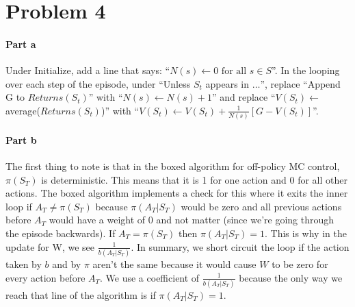 \documentclass[12pt]{article}
\begin{document}
\section{Problem 4}

\paragraph{Part a} Under Initialize, add a line that says: ``$N(s) \gets 0 \text{ for all } s \in S$''. In the looping over each step of the episode, under ``Unless $S_t$ appears in $\dots$'', replace ``Append G to $Returns(S_t)$'' with ``$N(s) \gets N(s) + 1$'' and replace ``$V(S_t) \gets$ average($Returns(S_t)$)'' with ``$V(S_t) \gets V(S_t) + \frac{1}{N(s)}[G - V(S_t)]$''.

\paragraph{Part b} The first thing to note is that in the boxed algorithm for off-policy MC control, $\pi(S_T)$ is deterministic. This means that it is 1 for one action and 0 for all other actions. The boxed algorithm implements a check for this where it exits the inner loop if $A_T \neq \pi(S_T)$ because $\pi(A_T | S_T)$ would be zero and all previous actions before $A_T$ would have a weight of 0 and not matter (since we're going through the episode backwards). If $A_T = \pi(S_T)$ then $\pi(A_T | S_T) = 1$. This is why in the update for W, we see $\frac{1}{b(A_T|S_T)}$. In summary, we short circuit the loop if the action taken by $b$ and by $\pi$ aren't the same because it would cause $W$ to be zero for every action before $A_T$. We use a coefficient of $\frac{1}{b(A_T|S_T)}$ because the only way we reach that line of the algorithm is if $\pi(A_T | S_T) = 1$.



\end{document}
